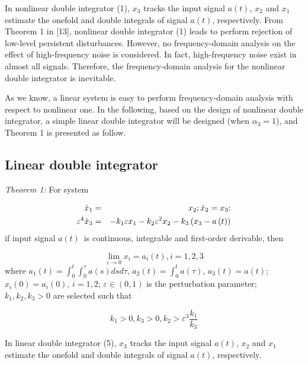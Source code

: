 \documentclass[10pt,journal]{IEEEtran}
\begin{document}
In nonlinear double integrator (1), $x_{3}$ tracks the input signal $a(t)$, $x_{2}$ and $x_{1}$ estimate the onefold and double integrals of signal $a(t)$, respectively. From Theorem 1 in [13], nonlinear double integrator (1)
leads to perform rejection of low-level persistent disturbances. However, no
frequency-domain analysis on the effect of high-frequency noise is
considered. In fact, high-frequency noise exist in almost all signals.
Therefore, the frequency-domain analysis for the nonlinear double integrator
is inevitable.

As we know, a linear system is easy to perform frequency-domain analysis
with respect to nonlinear one. In the following, based on the design of
nonlinear double integrator, a simple linear double integrator will be
designed (when $\alpha _{3}=1$), and Theorem 1 is presented as follow.

\subsection{Linear double integrator}

\emph{Theorem 1:} For system

\begin{eqnarray}
\dot{x}_{1} &=&x_{2};\dot{x}_{2}=x_{3};  \notag \\
\varepsilon ^{4}\dot{x}_{3} &=&-k_{1}\varepsilon x_{1}-k_{2}\varepsilon
^{2}x_{2}-k_{3}\left( x_{3}-a\left( t\right) \right)
\end{eqnarray}if input signal $a\left( t\right) $\ is continuous, integrable and
first-order derivable, then

\begin{equation}
\underset{\varepsilon \rightarrow 0}{\lim }x_{i}=a_{i}\left( t\right)
,i=1,2,3
\end{equation}where $a_{1}\left( t\right) =\int_{0}^{t}\int_{0}^{\tau }a\left( s\right)
dsd\tau $, $a_{2}\left( t\right) =\int_{0}^{t}a\left( \tau \right) $, $a_{3}\left( t\right) =a\left( t\right) $; $x_{i}\left( 0\right) =a_{i}\left(
0\right) $, $i=1,2$; $\varepsilon \in \left( 0,1\right) $ is the
perturbation parameter; $k_{1},k_{2},k_{3}>0$ are selected such that

\begin{equation}
k_{1}>0,k_{3}>0,k_{2}>\varepsilon ^{3}\frac{k_{1}}{k_{3}}
\end{equation}

In linear double integrator (5), $x_{3}$ tracks the input signal $a(t)$, $x_{2}$ and $x_{1}$ estimate the onefold and double integrals of signal $a(t)$, respectively.
\end{document}
